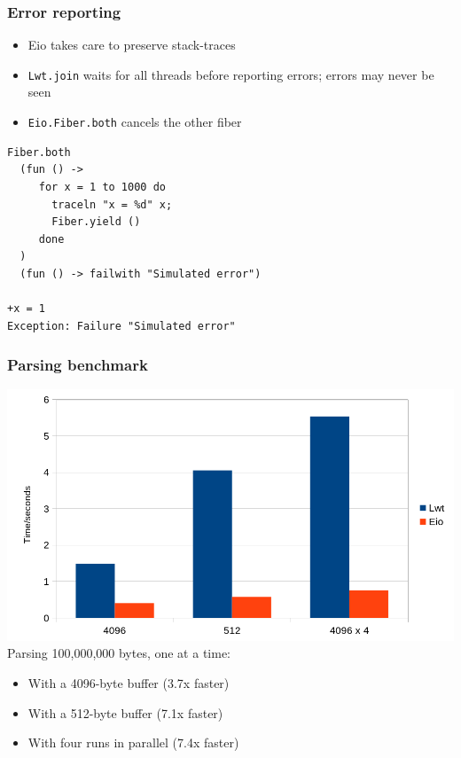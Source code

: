 \documentclass{beamer}
\begin{document}
\begin{frame}[fragile]
	\frametitle{Error reporting}
	\begin{itemize}
		\item Eio takes care to preserve stack-traces
		\item \verb|Lwt.join| waits for all threads before reporting errors;
		      errors may never be seen
		\item \verb|Eio.Fiber.both| cancels the other fiber
	\end{itemize}
	\bigskip
	\begin{lstlisting}[style=ocaml]
Fiber.both
  (fun () ->
     for x = 1 to 1000 do
       traceln "x = %d" x;
       Fiber.yield ()
     done
  )
  (fun () -> failwith "Simulated error")

+x = 1
Exception: Failure "Simulated error"
	\end{lstlisting}
\end{frame}

\begin{frame}
	\frametitle{Parsing benchmark}
	\includegraphics[width=\textwidth]{parsing.png}
	Parsing 100,000,000 bytes, one at a time:
	\begin{itemize}
		\item With a 4096-byte buffer (3.7x faster)
		\item With a 512-byte buffer (7.1x faster)
		\item With four runs in parallel (7.4x faster)
	\end{itemize}
\end{frame}
\end{document}
